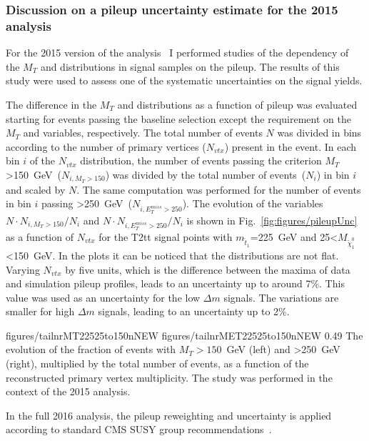 \subsubsection{Discussion on a pileup uncertainty estimate for the 2015 analysis}

For the 2015 version of the analysis~\cite{Sirunyan:2016jpr} I performed studies of the dependency of the $M_{T}$ and \MET distributions in signal samples on the pileup. The results of this study were used to assess one of the systematic uncertainties on the signal yields. 


The difference in the $M_{T}$ and \MET distributions as a function of pileup was evaluated starting for events passing the baseline selection except the requirement on the $M_{T}$ and \MET variables, respectively. The total number of events $N$ was divided in bins according to  the number of primary vertices  ($N_{vtx}$) present in the event. In each  bin $i$ of the $N_{vtx}$ distribution, the number of events passing the criterion $M_{T}$>150~GeV~($N_{i,M_{T}>150}$) was divided by the total number of events~($N_{i}$) in bin $i$ and scaled by $N$. The same computation was performed for the number of events in bin $i$ passing \MET>250~GeV~($N_{i,E_{T}^{miss}>250}$). The evolution of the variables $N \cdot N_{i,M_{T}>150}/N_{i}$ and $N \cdot N_{i,E_{T}^{miss}>250}/N_{i}$ is shown in  Fig.~\ref{fig:figures/pileupUnc} as a function of $N_{vtx}$ for the T2tt signal points with $m_{\tilde{t}_{1}}$=225~GeV and 25<$M_{\tilde{\chi}_{1}^{0}}$<150~GeV. In the plots it can be noticed that  the distributions are not flat. Varying $N_{vtx}$ by five units, which is the difference between the maxima of data and simulation pileup profiles, leads to an uncertainty up to around 7\%. This value was used as an uncertainty for the low $\Delta m$ signals. The variations are smaller for high $\Delta m$ signals, leading to an uncertainty up to 2\%.

                 {figures/tailnrMT22525to150nNEW} %
                 {figures/tailnrMET22525to150nNEW} %
                 {0.49}       %
                 { The evolution  of the fraction of events with $M_{T}>150$~GeV (left) and \MET>250~GeV (right), multiplied by the total number of events, as a function of the reconstructed primary vertex multiplicity. The study was performed in the context of the 2015 analysis. }


 In the full 2016 analysis, the pileup reweighting and uncertainty is applied according to standard CMS SUSY group recommendations~\cite{website:SUSYrec}.


